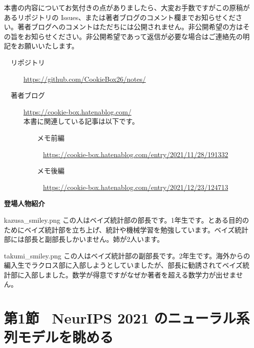 \documentclass[b5paper,xelatex,ja=standard,10pt]{bxjsarticle}
\begin{document}
本書の内容についてお気付きの点がありましたら、大変お手数ですがこの原稿があるリポジトリの Issues、または著者ブログのコメント欄までお知らせください。著者ブログへのコメントはただちには公開されません。非公開希望の方はその旨をお知らせください。非公開希望であって返信が必要な場合はご連絡先の明記をお願いいたします。

\begin{description}
    \item[　リポジトリ] \url{https://github.com/CookieBox26/notes/}
    \item[　著者ブログ] \url{https://cookie-box.hatenablog.com/} \\ 本書に関連している記事は以下です。
    \begin{description}
        \item[　　メモ前編] \url{https://cookie-box.hatenablog.com/entry/2021/11/28/191332}
        \item[　　メモ後編] \url{https://cookie-box.hatenablog.com/entry/2021/12/23/124713}
    \end{description}
\end{description}

\vspace{6pt}
\centerline{\textbf{登場人物紹介}}

\vspace{1pt}
\begin{SERIFU}[colback=White, colbacktitle=PaleIris2, top=-1pt, bottom=0pt, left=18pt, right=10pt]{kazusa_smiley.png}
\small
この人はベイズ統計部の部長です。1年生です。とある目的のためにベイズ統計部を立ち上げ、統計や機械学習を勉強しています。ベイズ統計部には部長と副部長しかいません。姉が2人います。
\end{SERIFU}
\begin{SERIFU}[colback=White, colbacktitle=PaleGold2, top=-1pt, bottom=0pt, left=18pt, right=10pt]{takumi_smiley.png}
\small
この人はベイズ統計部の副部長です。2年生です。海外からの編入生でラクロス部に入部しようとしていましたが、部長に勧誘されてベイズ統計部に入部しました。数学が得意ですがなぜか著者を超える数学力が出せません。
\end{SERIFU}

\vspace{6pt}
\section*{第1節 \, NeurIPS 2021 のニューラル系列モデルを眺める}
\vspace{5pt}
\end{document}
